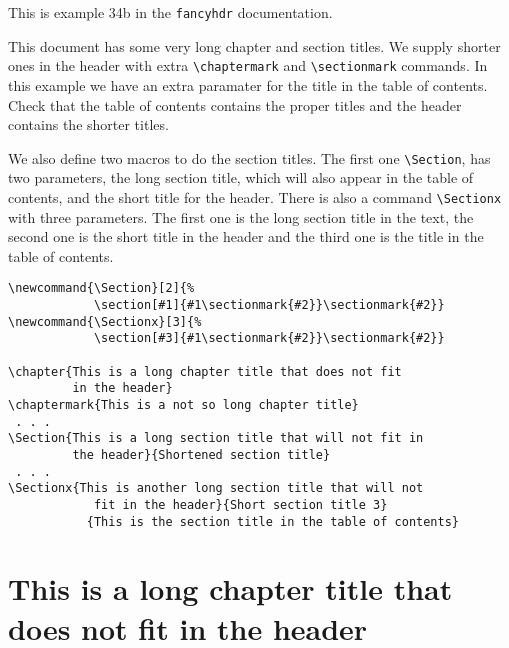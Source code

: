 \documentclass[oneside]{book}
\newcommand{\Section}[2]{%
            \section[#1]{#1\sectionmark{#2}}\sectionmark{#2}}
\newcommand{\Sectionx}[3]{%
            \section[#3]{#1\sectionmark{#2}}\sectionmark{#2}}
\begin{document}
\thispagestyle{plain}
\tableofcontents

\bigskip

\noindent
\begin{boxedminipage}{\textwidth}
This is example 34b in the \texttt{fancyhdr} documentation.

This document has some very long chapter and section titles. We supply shorter ones in the header with extra \verb|\chaptermark| and \verb|\sectionmark| commands. In this example we have an extra paramater for the title in the table of contents.
Check that the table of contents contains the proper titles and the header contains the shorter titles.

We also define two macros to do the section titles. The first one \verb|\Section|, has two parameters, the long section title, which will also appear in the table of contents, and the short title for the header.
There is also a command \verb|\Sectionx| with three parameters. The first one is the long section title in the text, the second one is the short title in the header and the third one is the title in the table of contents.

\begin{verbatim}
\newcommand{\Section}[2]{%
            \section[#1]{#1\sectionmark{#2}}\sectionmark{#2}}
\newcommand{\Sectionx}[3]{%
            \section[#3]{#1\sectionmark{#2}}\sectionmark{#2}}

\chapter{This is a long chapter title that does not fit
         in the header}
\chaptermark{This is a not so long chapter title}
 . . .
\Section{This is a long section title that will not fit in
         the header}{Shortened section title}
 . . .
\Sectionx{This is another long section title that will not
            fit in the header}{Short section title 3}
           {This is the section title in the table of contents}
\end{verbatim}
\end{boxedminipage}

\newpage
\pagestyle{fancy}
\chapter{This is a long chapter title that does not fit in the header}
\thispagestyle{fancy}
\end{document}
